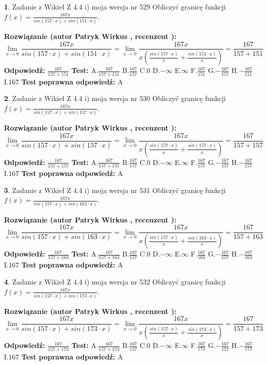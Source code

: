 \documentclass[12pt, a4paper]{article}
\theoremstyle{definition} %
\newtheorem{zad}{}
\newcommand{\zadStart}[1]{\begin{zad}#1\newline}
\newcommand{\zadStop}{\end{zad}}
\newcommand{\rozwStart}[2]{\noindent \textbf{Rozwiązanie (autor #1 , recenzent #2): }\newline}
\newcommand{\rozwStop}{\newline}
\newcommand{\odpStart}{\noindent \textbf{Odpowiedź:}\newline}
\newcommand{\odpStop}{\newline}
\newcommand{\testStart}{\noindent \textbf{Test:}\newline}
\newcommand{\testStop}{\newline}
\newcommand{\kluczStart}{\noindent \textbf{Test poprawna odpowiedź:}\newline}
\newcommand{\kluczStop}{\newline}
\begin{document}
\zadStart{Zadanie z Wikieł Z 4.4 i) moja wersja nr 529}
Obliczyć granicę funkcji $f(x)=\frac{167x}{sin(157\cdot x) +sin(151\cdot x)}$.
\zadStop
\rozwStart{Patryk Wirkus}{}
$$\lim\limits_{x\to 0}\frac{167x}{sin(157\cdot x) +sin(151\cdot x)}=\lim\limits_{x\to 0}\frac{167x}{x(\frac{sin(157\cdot x)}{x}+\frac{sin(151\cdot x)}{x})}=\frac{167}{157+151}$$
\rozwStop
\odpStart
$\frac{167}{157+151}$
\odpStop
\testStart
A.$\frac{167}{157+151}$
B.$\frac{167}{157}$
C.$0$
D.$-\infty$
E.$\infty$
F.$\frac{167}{151}$
G.$-\frac{167}{157}$
H.$-\frac{167}{151}$
I.$167$
\testStop
\kluczStart
A
\kluczStop



\zadStart{Zadanie z Wikieł Z 4.4 i) moja wersja nr 530}
Obliczyć granicę funkcji $f(x)=\frac{167x}{sin(157\cdot x) +sin(157\cdot x)}$.
\zadStop
\rozwStart{Patryk Wirkus}{}
$$\lim\limits_{x\to 0}\frac{167x}{sin(157\cdot x) +sin(157\cdot x)}=\lim\limits_{x\to 0}\frac{167x}{x(\frac{sin(157\cdot x)}{x}+\frac{sin(157\cdot x)}{x})}=\frac{167}{157+157}$$
\rozwStop
\odpStart
$\frac{167}{157+157}$
\odpStop
\testStart
A.$\frac{167}{157+157}$
B.$\frac{167}{157}$
C.$0$
D.$-\infty$
E.$\infty$
F.$\frac{167}{157}$
G.$-\frac{167}{157}$
H.$-\frac{167}{157}$
I.$167$
\testStop
\kluczStart
A
\kluczStop



\zadStart{Zadanie z Wikieł Z 4.4 i) moja wersja nr 531}
Obliczyć granicę funkcji $f(x)=\frac{167x}{sin(157\cdot x) +sin(163\cdot x)}$.
\zadStop
\rozwStart{Patryk Wirkus}{}
$$\lim\limits_{x\to 0}\frac{167x}{sin(157\cdot x) +sin(163\cdot x)}=\lim\limits_{x\to 0}\frac{167x}{x(\frac{sin(157\cdot x)}{x}+\frac{sin(163\cdot x)}{x})}=\frac{167}{157+163}$$
\rozwStop
\odpStart
$\frac{167}{157+163}$
\odpStop
\testStart
A.$\frac{167}{157+163}$
B.$\frac{167}{157}$
C.$0$
D.$-\infty$
E.$\infty$
F.$\frac{167}{163}$
G.$-\frac{167}{157}$
H.$-\frac{167}{163}$
I.$167$
\testStop
\kluczStart
A
\kluczStop



\zadStart{Zadanie z Wikieł Z 4.4 i) moja wersja nr 532}
Obliczyć granicę funkcji $f(x)=\frac{167x}{sin(157\cdot x) +sin(173\cdot x)}$.
\zadStop
\rozwStart{Patryk Wirkus}{}
$$\lim\limits_{x\to 0}\frac{167x}{sin(157\cdot x) +sin(173\cdot x)}=\lim\limits_{x\to 0}\frac{167x}{x(\frac{sin(157\cdot x)}{x}+\frac{sin(173\cdot x)}{x})}=\frac{167}{157+173}$$
\rozwStop
\odpStart
$\frac{167}{157+173}$
\odpStop
\testStart
A.$\frac{167}{157+173}$
B.$\frac{167}{157}$
C.$0$
D.$-\infty$
E.$\infty$
F.$\frac{167}{173}$
G.$-\frac{167}{157}$
H.$-\frac{167}{173}$
I.$167$
\testStop
\kluczStart
A
\kluczStop
\end{document}
